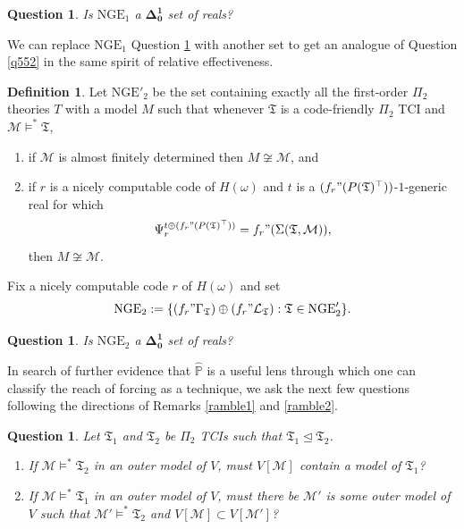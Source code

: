 \documentclass[12pt, twoside]{memoir}
\numberwithin{equation}{section}
\newtheorem{ques}[thm]{Question}
\theoremstyle{definition}
\newtheorem{defi}[thm]{Definition}
\theoremstyle{remark}
\theoremstyle{definition}
\theoremstyle{definition}
\theoremstyle{definition}
\theoremstyle{remark}
\begin{document}
\begin{ques}\label{q553}
Is $\mathrm{NGE}_1$ a $\mathbf{\Delta^1_0}$ set of reals?
\end{ques}

We can replace $\mathrm{NGE}_1$ Question \ref{q553} with another set to get an analogue of Question \ref{q552} in the same spirit of relative effectiveness. 

\begin{defi}
Let $\mathrm{NGE}'_2$ be the set containing exactly all the first-order $\Pi_2$ theories $T$ with a model $M$ such that whenever $\mathfrak{T}$ is a code-friendly $\Pi_2$ TCI and $\mathcal{M} \models^* \mathfrak{T}$,
\begin{enumerate}[label=(\alph*)]
    \item if $\mathcal{M}$ is almost finitely determined then $M \not \cong \mathcal{M}$, and
    \item if $r$ is a nicely computable code of $H(\omega)$ and $t$ is a $(f_r" (P(\mathfrak{T})^{\top}))$-$1$-generic real for which
    \begin{equation*}
        \Psi_r^{t \oplus (f_r" (P(\mathfrak{T})^{\top}))} = f_r" (\Sigma(\mathfrak{T}, \mathcal{M})) \text{,}
    \end{equation*}
    then $M \not \cong \mathcal{M}$.
\end{enumerate}
\end{defi}

Fix a nicely computable code $r$ of $H(\omega)$ and set
\begin{equation*}
    \mathrm{NGE}_2 := \{(f_r" \Gamma_{\mathfrak{T}}) \oplus (f_r" \mathcal{L}_{\mathfrak{T}}) : \mathfrak{T} \in \mathrm{NGE}'_2\} \text{.}
\end{equation*}

\begin{ques}
Is $\mathrm{NGE}_2$ a $\mathbf{\Delta^1_0}$ set of reals?
\end{ques}

In search of further evidence that $\hat{\mathbb{P}}$ is a useful lens through which one can classify the reach of forcing as a technique, we ask the next few questions following the directions of Remarks \ref{ramble1} and \ref{ramble2}.

\begin{ques}
Let $\mathfrak{T}_1$ and $\mathfrak{T}_2$ be $\Pi_2$ TCIs such that $\mathfrak{T}_1 \trianglelefteq \mathfrak{T}_2$.
\begin{enumerate}[label=(\arabic*)]
    \item If $\mathcal{M} \models^* \mathfrak{T}_2$ in an outer model of $V$, must $V[\mathcal{M}]$ contain a model of $\mathfrak{T}_1$?
    \item If $\mathcal{M} \models^* \mathfrak{T}_1$ in an outer model of $V$, must there be $\mathcal{M}'$ is some outer model of $V$ such that $\mathcal{M}' \models^* \mathfrak{T}_2$ and $V[\mathcal{M}] \subset V[\mathcal{M}']$?
\end{enumerate}
\end{ques}
\end{document}
